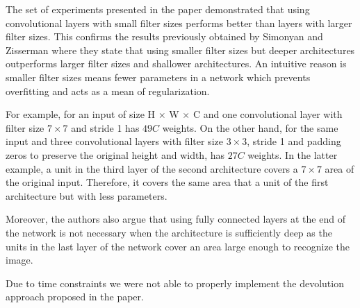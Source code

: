 The set of experiments presented in the paper demonstrated that using convolutional layers with small filter sizes performs better than layers with larger filter sizes. This confirms the results previously obtained by Simonyan and Zisserman \cite{simonyan2014very} where they state that using smaller filter sizes but deeper architectures outperforms larger filter sizes and shallower architectures. An intuitive reason is smaller filter sizes means fewer parameters in a network which prevents overfitting and acts as a mean of regularization.

For example, for an input of size H $\times$ W $\times$ C and one convolutional layer with filter size $7 \times 7$ and stride 1 has $49C$ weights. On the other hand, for the same input and three convolutional layers with filter size $3 \times 3$, stride 1 and padding zeros to preserve the original height and width, has $27C$ weights. In the latter example, a unit in the third layer of the second architecture covers a $7 \times 7$ area of the original input. Therefore, it covers the same area that a unit of the first architecture but with less parameters.

Moreover, the authors also argue that using fully connected layers at the end of the network is not necessary when the architecture is sufficiently deep as the units in the last layer of the network cover an area large enough to recognize the image.

Due to time constraints we were not able to properly implement the devolution approach proposed in the paper. 
